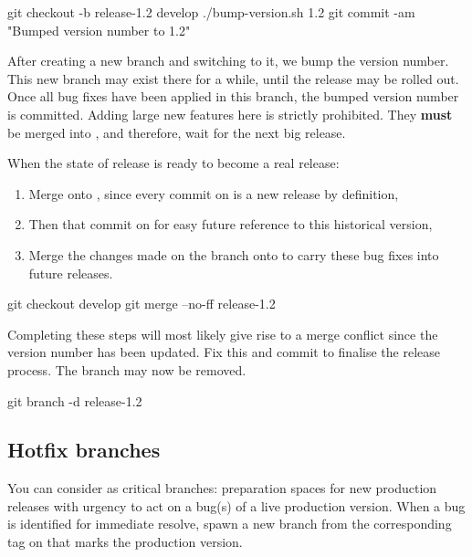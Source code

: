 \begin{git-bash}
    git checkout -b release-1.2 develop
    ./bump-version.sh 1.2
    git commit -am "Bumped version number to 1.2"
\end{git-bash}

After creating a new branch and switching to it, we bump the version number. This new branch may exist there for a while, until the release may be rolled out. Once all bug fixes have been applied in this branch, the bumped version number is committed. Adding large new features here is strictly prohibited. They \textbf{must} be merged into , and therefore, wait for the next big release. \newline

\noindent When the state of release is ready to become a real release:

\begin{enumerate}
	\item Merge onto , since every commit on  is a new release by definition,
	\item Then  that commit on  for easy future reference to this historical version,
	\item Merge the changes made on the  branch onto  to carry these bug fixes into future releases.
\end{enumerate}

\begin{git-bash}
    git checkout develop
    git merge --no-ff release-1.2
\end{git-bash}

Completing these steps will most likely give rise to a merge conflict since the version number has been updated. Fix this and commit to finalise the release process. The  branch may now be removed.

\begin{git-bash}
    git branch -d release-1.2
\end{git-bash}



\subsection{Hotfix branches}

You can consider  as critical  branches: preparation spaces for new production releases with urgency to act on a bug(s) of a live production version. When a bug is identified for immediate resolve, spawn a new  branch from the corresponding tag on  that marks the production version.

